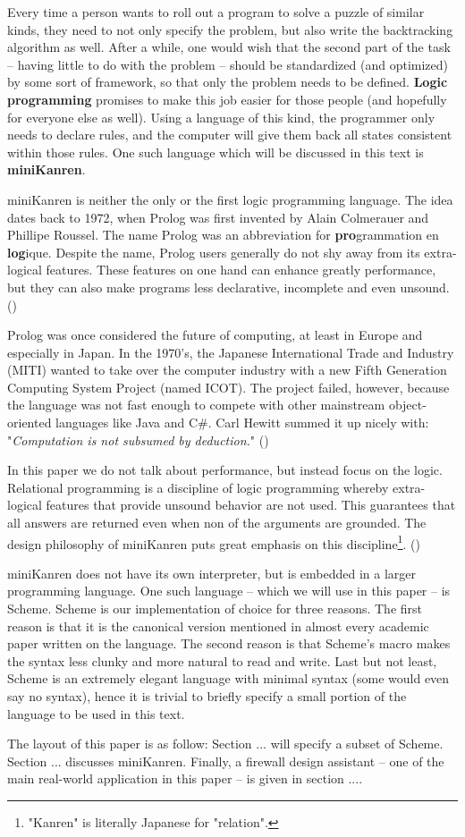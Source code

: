 Every time a person wants to roll out a program to solve a puzzle of similar kinds, they need to not only specify the problem, but also write the backtracking algorithm as well. After a while, one would wish that the second part of the task -- having little to do with the problem -- should be standardized (and optimized) by some sort of framework, so that only the problem needs to be defined. \textbf{Logic programming} promises to make this job easier for those people (and hopefully for everyone else as well). Using a language of this kind, the programmer only needs to declare rules, and the computer will give them back all states consistent within those rules. One such language which will be discussed in this text is \textbf{miniKanren}.

miniKanren is neither the only or the first logic programming language. The idea dates back to 1972, when Prolog was first invented by Alain Colmerauer and Phillipe Roussel. The name Prolog was an abbreviation for \textbf{pro}grammation en \textbf{log}ique. Despite the name, Prolog users generally do not shy away from its extra-logical features. These features on one hand can enhance greatly performance, but they can also make programs less declarative, incomplete and even unsound. (\cite{early-prolog})

Prolog was once considered the future of computing, at least in Europe and especially in Japan. In the 1970's, the Japanese International Trade and Industry (MITI) wanted to take over the computer industry with a new Fifth Generation Computing System Project (named ICOT). The project failed, however, because the language was not fast enough to compete with other mainstream object-oriented languages like Java and C\#. Carl Hewitt summed it up nicely with: "\textit{Computation is not subsumed by deduction.}" (\cite{logic-fail})

In this paper we do not talk about performance, but instead focus on the logic. Relational programming is a discipline of logic programming whereby extra-logical features that provide unsound behavior are not used. This guarantees that all answers are returned even when non of the arguments are grounded. The design philosophy of miniKanren puts great emphasis on this discipline\footnote{"Kanren" is literally Japanese for "relation".}. (\cite{byrdphd})

miniKanren does not have its own interpreter, but is embedded in a larger programming language. One such language -- which we will use in this paper -- is Scheme. Scheme is our implementation of choice for three reasons. The first reason is that it is the canonical version mentioned in almost every academic paper written on the language. The second reason is that Scheme's macro makes the syntax less clunky and more natural to read and write. Last but not least, Scheme is an extremely elegant language with minimal syntax (some would even say no syntax), hence it is trivial to briefly specify a small portion of the language to be used in this text.

The layout of this paper is as follow: Section ... will specify a subset of Scheme. Section ... discusses miniKanren. Finally, a firewall design assistant -- one of the main real-world application in this paper -- is given in section ....